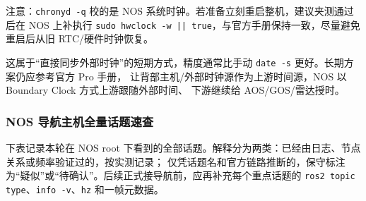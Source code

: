\documentclass[UTF8,11pt,a4paper]{ctexart}
\begin{document}
注意：\texttt{chronyd -q} 校的是 NOS 系统时钟。若准备立刻重启整机，建议夹测通过后在 NOS 上补执行
\texttt{sudo hwclock -w || true}，与官方手册保持一致，尽量避免重启后从旧 RTC/硬件时钟恢复。

这属于“直接同步外部时钟”的短期方式，精度通常比手动 \texttt{date -s} 更好。长期方案仍应参考官方 Pro 手册，
让背部主机/外部时钟源作为上游时间源，NOS 以 Boundary Clock 方式上游跟随外部时间、
下游继续给 AOS/GOS/雷达授时。

\subsubsection{NOS 导航主机全量话题速查}

下表记录本轮在 NOS root 下看到的全部话题。解释分为两类：已经由日志、节点关系或频率验证过的，按实测记录；
仅凭话题名和官方链路推断的，保守标注为“疑似”或“待确认”。后续正式接导航前，应再补充每个重点话题的
\texttt{ros2 topic type}、\texttt{info -v}、\texttt{hz} 和一帧元数据。
\end{document}
